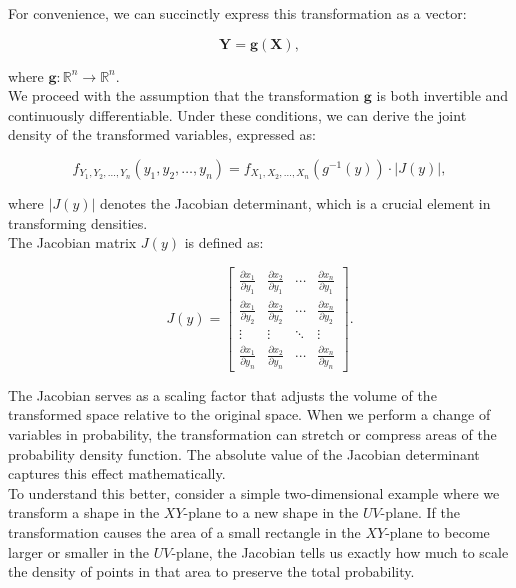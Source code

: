For convenience, we can succinctly express this transformation as a vector:

\[
\mathbf{Y} = \mathbf{g}(\mathbf{X}),
\]

where \(\mathbf{g}: \mathbb{R}^n \to \mathbb{R}^n\).\\

We proceed with the assumption that the transformation \(\mathbf{g}\) is both invertible and continuously differentiable. Under these conditions, we can derive the joint density of the transformed variables, expressed as:

\[
f_{Y_1, Y_2, \ldots, Y_n}(y_1, y_2, \ldots, y_n) = f_{X_1, X_2, \ldots, X_n}(g^{-1}(y)) \cdot |J(y)|,
\]

where \(|J(y)|\) denotes the Jacobian determinant, which is a crucial element in transforming densities. \\

The Jacobian matrix \(J(y)\) is defined as:

\[
J(y) =
\begin{bmatrix}
\frac{\partial x_1}{\partial y_1} & \frac{\partial x_2}{\partial y_1} & \cdots & \frac{\partial x_n}{\partial y_1} \\
\frac{\partial x_1}{\partial y_2} & \frac{\partial x_2}{\partial y_2} & \cdots & \frac{\partial x_n}{\partial y_2} \\
\vdots & \vdots & \ddots & \vdots \\
\frac{\partial x_1}{\partial y_n} & \frac{\partial x_2}{\partial y_n} & \cdots & \frac{\partial x_n}{\partial y_n}
\end{bmatrix}.
\]

The Jacobian serves as a scaling factor that adjusts the volume of the transformed space relative to the original space. When we perform a change of variables in probability, the transformation can stretch or compress areas of the probability density function. The absolute value of the Jacobian determinant captures this effect mathematically. \\

To understand this better, consider a simple two-dimensional example where we transform a shape in the \(XY\)-plane to a new shape in the \(UV\)-plane. If the transformation causes the area of a small rectangle in the \(XY\)-plane to become larger or smaller in the \(UV\)-plane, the Jacobian tells us exactly how much to scale the density of points in that area to preserve the total probability.

